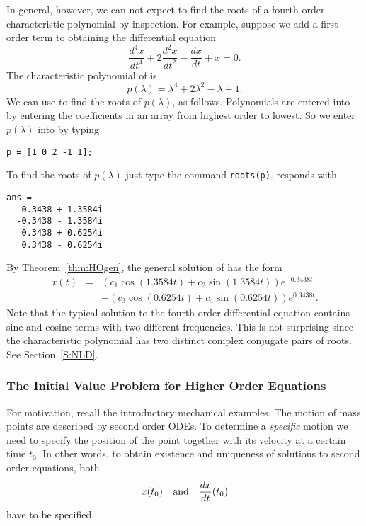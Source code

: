 \documentclass{ximera}
\begin{document}
In general, however, we can not expect to find the roots of a fourth order
characteristic polynomial by inspection.  For example, suppose we add a first
order term to  obtaining the differential equation
\begin{equation}  \label{eq:soex3a}
\frac{d^4x}{dt^4} + 2\frac{d^2x}{dt^2} - \frac{dx}{dt} + x= 0.
\end{equation}
The characteristic polynomial of  is
\[
p(\lambda) = \lambda^4 + 2\lambda^2 - \lambda + 1 .
\]
We can use \Matlab to find the roots of $p(\lambda)$, as follows. 
Polynomials are entered into \Matlab by entering the coefficients in an array
from highest order to lowest.  So we enter $p(\lambda)$ into \Matlab by
typing
\begin{verbatim}
p = [1 0 2 -1 1];
\end{verbatim}
To find the roots of $p(\lambda)$ just type the command {\tt roots(p)}.
\Matlab responds with 
\begin{verbatim}
ans =
  -0.3438 + 1.3584i
  -0.3438 - 1.3584i
   0.3438 + 0.6254i
   0.3438 - 0.6254i
\end{verbatim}
By Theorem~\ref{thm:HOgen}, the general solution of  has the 
form
\[
\begin{array}{rcl}
x(t) & = & (c_1 \cos(1.3584t)+ c_2 \sin(1.3584t))e^{-0.3438t} \\
 & & + (c_3 \cos(0.6254t)+ c_4 \sin(0.6254t))e^{0.3438t}.\end{array}
\]
Note that the typical solution to the fourth order differential equation 
 contains sine and cosine terms with two different 
frequencies.  This is not surprising since the characteristic polynomial 
has two distinct complex conjugate pairs of roots.  See Section~\ref{S:NLD}.


\subsubsection*{The Initial Value Problem for Higher Order Equations}

For motivation, recall the introductory mechanical examples.  The motion 
of mass points are described by second order ODEs.  To determine a 
{\em specific\/} motion we need to specify the position of the point 
together with its velocity at a certain time $t_0$.  In other words, to 
obtain existence and uniqueness of solutions to second order equations, 
both
\[
x(t_0)\quad\mbox{and}\quad \frac{dx}{dt}(t_0)
\]
have to be specified.  
\end{document}
